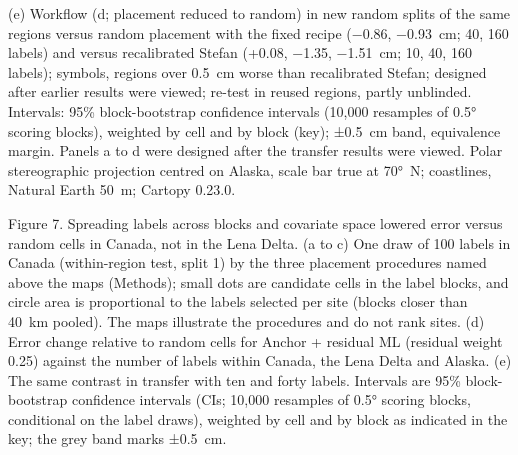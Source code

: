 (e) Workflow (d; placement reduced to random) in new random splits of the same regions versus random placement with the fixed recipe (−0.86, −0.93~cm; 40, 160 labels) and versus recalibrated Stefan (+0.08, −1.35, −1.51~cm; 10, 40, 160 labels); symbols, regions over 0.5~cm worse than recalibrated Stefan; designed after earlier results were viewed; re-test in reused regions, partly unblinded.
Intervals: 95\% block-bootstrap confidence intervals (10,000 resamples of 0.5° scoring blocks), weighted by cell and by block (key); ±0.5~cm band, equivalence margin.
Panels a to d were designed after the transfer results were viewed.
Polar stereographic projection centred on Alaska, scale bar true at 70°~N; coastlines, Natural Earth 50~m; Cartopy 0.23.0.

\noindent Figure 7. Spreading labels across blocks and covariate space lowered error versus random cells in Canada, not in the Lena Delta.
(a to c) One draw of 100 labels in Canada (within-region test, split 1) by the three placement procedures named above the maps (Methods); small dots are candidate cells in the label blocks, and circle area is proportional to the labels selected per site (blocks closer than 40~km pooled).
The maps illustrate the procedures and do not rank sites.
(d) Error change relative to random cells for Anchor + residual ML (residual weight 0.25) against the number of labels within Canada, the Lena Delta and Alaska.
(e) The same contrast in transfer with ten and forty labels.
Intervals are 95\% block-bootstrap confidence intervals (CIs; 10,000 resamples of 0.5° scoring blocks, conditional on the label draws), weighted by cell and by block as indicated in the key; the grey band marks ±0.5~cm.
